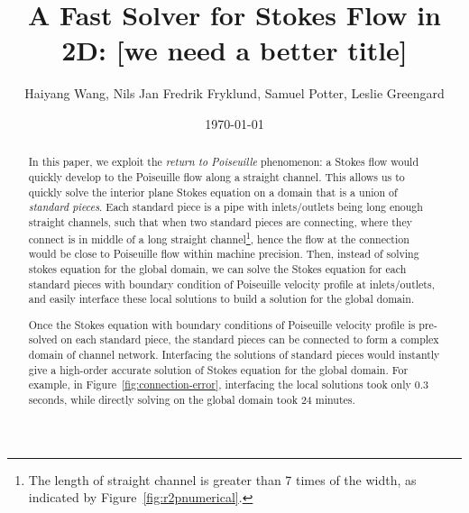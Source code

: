\documentclass[10pt,twocolumn,letterpaper]{article}
\author{Haiyang Wang, Nils Jan Fredrik Fryklund, Samuel Potter, Leslie Greengard}
\date{\today}
\title{A Fast Solver for Stokes Flow in 2D: [we need a better title]}
\begin{document}
\maketitle

\begin{abstract}
  In this paper, we exploit the \textit{return to Poiseuille} phenomenon:
  a Stokes flow would quickly develop to the Poiseuille flow along a straight channel.
  This allows us to quickly solve the interior plane Stokes equation
  on a domain that is a union of \textit{standard pieces}.
  Each standard piece is a pipe with inlets/outlets
  being long enough straight channels, 
  such that when two standard pieces are connecting,
  where they connect is in middle of a long
  straight channel\footnote{
    The length of straight channel is greater than 7 times of the width,
    as indicated by Figure~\ref{fig:r2pnumerical}.}, 
  hence the flow at the connection would be close to Poiseuille flow 
  within machine precision.
  Then, instead of solving stokes equation for the global domain,
  we can solve the Stokes equation
  for each standard pieces with boundary condition of Poiseuille velocity profile at inlets/outlets,
  and easily interface these local solutions to build a solution for the global domain.

  Once the Stokes equation with boundary conditions 
  of Poiseuille velocity profile is pre-solved on each standard piece, 
  the standard pieces can be connected to form 
  a complex domain of channel network. 
  Interfacing the solutions of standard pieces would instantly give 
  a high-order accurate solution of Stokes equation for the global domain. 
  For example, in Figure~\ref{fig:connection-error}, 
  interfacing the local solutions took only 0.3 seconds, 
  while directly solving on the global domain took 24 minutes.
\end{abstract}
\end{document}
